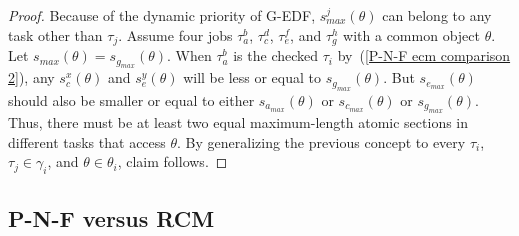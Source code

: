 \begin{proof}
%
Because of the dynamic priority of G-EDF, $s_{max}^{j}(\theta)$
can belong to any task other than $\tau_{j}$. Assume four jobs $\tau_a^b$, $\tau_c^d$, $\tau_e^f$, and $\tau_g^h$ with a common object $\theta$. Let $s_{max}(\theta)=s_{g_{max}}(\theta)$. When $\tau_a^b$ is the checked $\tau_i$ by~(\ref{P-N-F ecm comparison 2}), any $s_c^x(\theta)$ and $s_e^y(\theta)$ will be less or equal to $s_{g_{max}}(\theta)$. But $s_{e_{max}}(\theta)$ should also be smaller or equal to either $s_{a_{max}}(\theta)$ or $s_{c_{max}}(\theta)$ or $s_{g_{max}}(\theta)$. Thus, there must be at least two equal maximum-length atomic sections in different tasks that access $\theta$. By generalizing the previous concept to every $\tau_i$, $\tau_j \in \gamma_i$,  and $\theta \in \theta_i$, claim follows.
\end{proof}

\subsection{P-N-F versus RCM\label{pnf vs rcm sec}}


